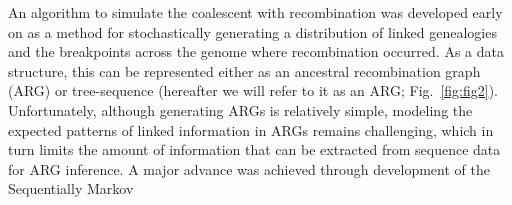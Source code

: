 \documentclass[11pt]{article}
\begin{document}
An algorithm to simulate the coalescent with recombination was developed 
early on 
\citep{hudson1983properties}
as a method for stochastically
generating
a distribution of linked genealogies and the
breakpoints across the genome where recombination occurred.
As a data structure,
this can be represented either as an ancestral recombination graph (ARG)
\citep{griffiths_ancestral_1996} or tree-sequence \citep{kelleher2016efficient}
(hereafter we will refer to it as an ARG; Fig.~\ref{fig:fig2}).
Unfortunately, although generating ARGs is relatively simple, 
modeling the expected patterns of linked information in ARGs remains 
challenging, which in turn limits the amount of information that can
be extracted from sequence data for ARG inference. 
A major advance was achieved through development of the Sequentially Markov 
\end{document}
